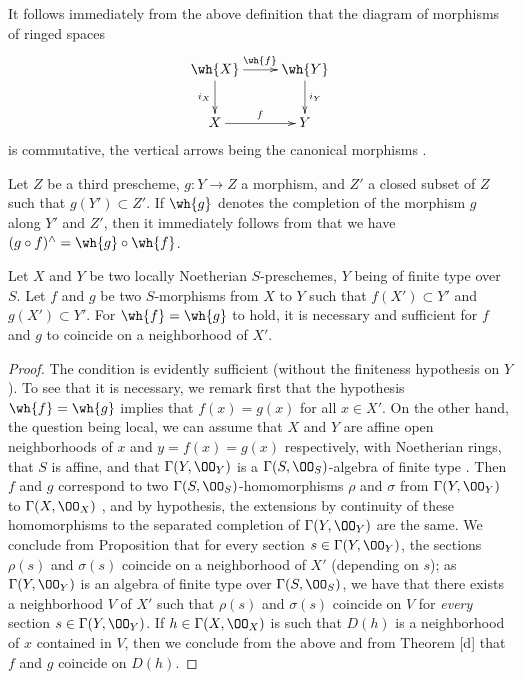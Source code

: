 \begin{env}[10.9.2]
\label{1.10.9.2}
It follows immediately from the above definition that the diagram of morphisms of ringed spaces
\[
  \xymatrix{
    \wh{X}\ar[r]^{\wh{f}}\ar[d]_{i_X} &
    \wh{Y}\ar[d]^{i_Y}\\
    X\ar[r]^f &
    Y
  }
\]
is commutative, the vertical arrows being the canonical morphisms .
\end{env}

\begin{env}[10.9.3]
\label{1.10.9.3}
Let $Z$ be a third prescheme, $g:Y\to Z$ a morphism, and $Z'$ a closed subset of $Z$ such that $g(Y')\subset Z'$.
If $\wh{g}$ denotes the completion of the morphism $g$ along $Y'$ and $Z'$, then it immediately follows from  that we have $(g\circ f)^\wedge=\wh{g}\circ\wh{f}$.
\end{env}

\begin{prop}[10.9.4]
\label{1.10.9.4}
Let $X$ and $Y$ be two locally Noetherian $S$-preschemes, $Y$ being of finite type over $S$.
Let $f$ and $g$ be two $S$-morphisms from $X$ to $Y$ such that $f(X')\subset Y'$ and $g(X')\subset Y'$.
For $\wh{f}=\wh{g}$ to hold, it is necessary and sufficient for $f$ and $g$ to coincide on a neighborhood of $X'$.
\end{prop}

\begin{proof}
\label{proof-1.10.9.4}
The condition is evidently sufficient (without the finiteness hypothesis on $Y$).
To see that it is necessary, we remark first that the hypothesis $\wh{f}=\wh{g}$ implies that $f(x)=g(x)$ for all $x\in X'$.
On the other hand, the question being local, we can assume that $X$ and $Y$ are affine open neighborhoods of $x$ and $y=f(x)=g(x)$ respectively, with Noetherian rings, that $S$ is affine, and that $\Gamma(Y,\OO_Y)$ is a $\Gamma(S,\OO_S)$-algebra of finite type .
Then $f$ and $g$ correspond to two $\Gamma(S,\OO_S)$-homomorphisms $\rho$ and $\sigma$ from $\Gamma(Y,\OO_Y)$ to $\Gamma(X,\OO_X)$ , and by hypothesis, the extensions by continuity of these homomorphisms to the separated completion of $\Gamma(Y,\OO_Y)$ are the same.
We conclude from Proposition  that for every section $s\in\Gamma(Y,\OO_Y)$, the sections $\rho(s)$ and $\sigma(s)$ coincide on a neighborhood of $X'$ (depending on $s$); as $\Gamma(Y,\OO_Y)$ is an algebra of finite type over $\Gamma(S,\OO_S)$, we have that there exists a neighborhood $V$ of $X'$ such that $\rho(s)$ and $\sigma(s)$ coincide on $V$ for \emph{every} section $s\in\Gamma(Y,\OO_Y)$.
If $h\in\Gamma(X,\OO_X)$ is such that $D(h)$ is a neighborhood of $x$ contained in $V$, then we conclude from the above and from Theorem [d] that $f$ and $g$ coincide on $D(h)$.
\end{proof}

